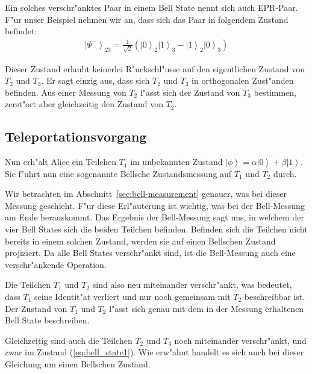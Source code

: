 \begin{refsection}
Ein solches verschr"anktes Paar in einem Bell State nennt sich auch EPR-Paar. F"ur unser Beispiel nehmen wir an, dass sich das Paar in folgendem Zustand befindet:
%
\begin{align}\label{eq:bell_state1}
\left|\Psi^{-}\right\rangle_{23} = \frac{1}{\sqrt{2}} ( \left|0\right\rangle_{2}\left|1\right\rangle_{3} - \left|1\right\rangle_{2}\left|0\right\rangle_{3} )
\end{align}

Dieser Zustand erlaubt keinerlei R"uckschl"usse auf den eigentlichen Zustand von $T_{2}$ und $T_{3}$. Er sagt einzig aus, dass sich $T_{2}$ und $T_{3}$ in orthogonalen Zust"anden befinden. Aus einer Messung von $T_{2}$ l"asst sich der Zustand von $T_{3}$ bestimmen, zerst"ort aber gleichzeitig den Zustand von $T_{2}$. 

\subsection{Teleportationsvorgang}\label{sec:teleportation}

Nun erh"alt Alice ein Teilchen $T_{1}$ im unbekannten Zustand $\left|\phi\right\rangle = \alpha\left|0\right\rangle + \beta\left|1\right\rangle$. Sie f"uhrt nun eine sogenannte Bellsche Zustandsmessung auf $T_{1}$ und $T_{2}$ durch.

Wir betrachten im Abschnitt~\ref{sec:bell-measurement} genauer, was bei dieser Messung geschieht. F"ur diese Erl"auterung ist wichtig, was bei der Bell-Messung am Ende herauskommt. Das Ergebnis der Bell-Messung sagt uns, in welchem der vier Bell States sich die beiden Teilchen befinden. Befinden sich die Teilchen nicht bereits in einem solchen Zustand, werden sie auf einen Bellschen Zustand projiziert. Da alle Bell States verschr"ankt sind, ist die Bell-Messung auch eine verschr"ankende Operation.

Die Teilchen $T_{1}$ und $T_{2}$ sind also neu miteinander verschr"ankt, was bedeutet, dass $T_{1}$ seine Identit"at verliert und nur noch gemeinsam mit $T_{2}$ beschreibbar ist. Der Zustand von $T_{1}$ und $T_{2}$ l"asst sich genau mit dem in der Messung erhaltenen Bell State beschreiben. 

Gleichzeitig sind auch die Teilchen $T_{2}$ und $T_{3}$ noch miteinander verschr"ankt, und zwar im Zustand (\ref{eq:bell_state1}). Wie erw"ahnt handelt es sich auch bei dieser Gleichung um einen Bellschen Zustand.


\end{refsection}
